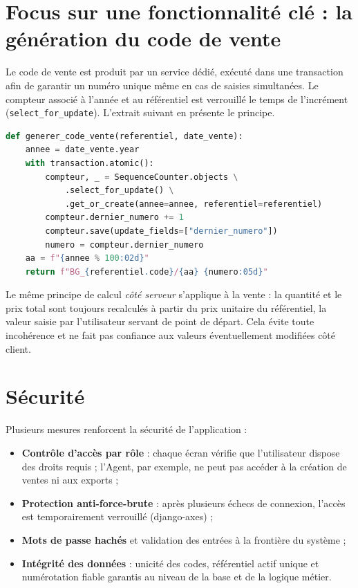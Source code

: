 \section{Focus sur une fonctionnalité clé : la génération du code de vente}

Le code de vente est produit par un service dédié, exécuté dans une transaction afin de garantir un numéro unique même en cas de saisies simultanées. Le compteur associé à l'année et au référentiel est verrouillé le temps de l'incrément (\texttt{select\_for\_update}). L'extrait suivant en présente le principe.

\begin{lstlisting}[language=python, caption={Génération du code de vente (principe)}, label={lst:code}]
def generer_code_vente(referentiel, date_vente):
    annee = date_vente.year
    with transaction.atomic():
        compteur, _ = SequenceCounter.objects \
            .select_for_update() \
            .get_or_create(annee=annee, referentiel=referentiel)
        compteur.dernier_numero += 1
        compteur.save(update_fields=["dernier_numero"])
        numero = compteur.dernier_numero
    aa = f"{annee % 100:02d}"
    return f"BG_{referentiel.code}/{aa} {numero:05d}"
\end{lstlisting}

Le même principe de calcul \emph{côté serveur} s'applique à la vente : la quantité et le prix total sont toujours recalculés à partir du prix unitaire du référentiel, la valeur saisie par l'utilisateur servant de point de départ. Cela évite toute incohérence et ne fait pas confiance aux valeurs éventuellement modifiées côté client.

\section{Sécurité}

Plusieurs mesures renforcent la sécurité de l'application :

\begin{itemize}
  \item \textbf{Contrôle d'accès par rôle} : chaque écran vérifie que l'utilisateur dispose des droits requis ; l'Agent, par exemple, ne peut pas accéder à la création de ventes ni aux exports ;
  \item \textbf{Protection anti-force-brute} : après plusieurs échecs de connexion, l'accès est temporairement verrouillé (django-axes) ;
  \item \textbf{Mots de passe hachés} et validation des entrées à la frontière du système ;
  \item \textbf{Intégrité des données} : unicité des codes, référentiel actif unique et numérotation fiable garantis au niveau de la base et de la logique métier.
\end{itemize}

